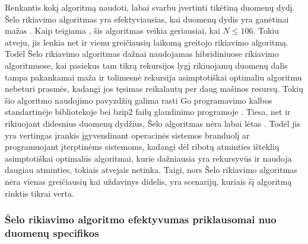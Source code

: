 \documentclass{VUMIFInfKursinis}
\begin{document}
Renkantis kokį algoritmą naudoti, labai svarbu įvertinti tikėtiną duomenų dydį.
Šelo rikiavimo algoritmas yra efektyviausias, kai duomenų dydis yra ganėtinai mažas \cite{ciura2001best}.
Kaip teigiama \cite{simpson1999faster}, šis algoritmas veikia geriausiai, kai $N \leq 106$.
Tokiu atveju, jis lenkia net ir vienu greičiausių laikomą greitojo rikiavimo algoritmą.
Todėl Šelo rikiavimo algoritmas dažnai naudojamas hibridiniuose rikiavimo algoritmuose, kai pasiekus tam tikrą rekursijos lygį
rikiuojamų duomenų dalis tampa pakankamai maža ir tolimesnė rekursija asimptotiškai optimaliu algoritmu nebeturi prasmės,
kadangi jos tęsimas reikalautų per daug mašinos resursų.
Tokių šio algoritmo naudojimo pavyzdžių galima rasti Go programavimo kalbos standartinėje bibliotekoje \cite{golangsort} bei
bzip2 failų glaudinimo programoje \cite{bzip2sort}.
Tiesa, net ir rikiuojant didesnius duomenų dydžius, Šelo algoritmas nėra labai lėtas \cite{ciura2001best}.
Todėl jis yra vertingas įrankis įgyvendinant operacinės sistemos branduolį ar programuojant įterptinėms sistemoms, kadangi dėl ribotų atminties išteklių
asimptotiškai optimalūs algoritmai, kurie dažniausia yra rekursyvūs ir naudoja daugiau atminties, tokiais atvejais netinka.
Taigi, nors Šelo rikiavimo algoritmas nėra vienas greičiausių kai uždavinys didelis,
yra scenarijų, kuriais šį algoritmą rinktis tikrai verta.

\subsubsection{Šelo rikiavimo algoritmo efektyvumas priklausomai nuo duomenų specifikos}
\end{document}
